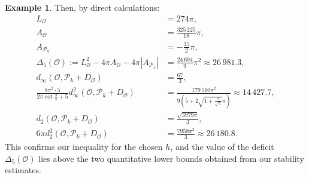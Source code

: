 \documentclass{amsart}
\theoremstyle{definition}
\newtheorem{ex}[thm]{Example}
\numberwithin{equation}{section}
\begin{document}
\begin{ex}
Then, by direct calculations:
\begin{align*}
    L_{\mathcal{O}}&=274\pi,\\
    A_{\mathcal{O}}&=\frac{325\, 225}{18}\pi,\\
    A_{\mathcal{P}_5}&=-\frac{35}{2}\pi,\\
    \Delta_5(\mathcal O):=L_{\mathcal{O}}^2-4\pi A_{\mathcal{O}}-4\pi\left|A_{\mathcal{P}_5}\right|&=\frac{24\, 604}{9}\pi^2\approx 26\, 981.3,\\ 
    d_{\infty}\left(\mathcal{O},\mathcal{P}_k+D_{\mathcal{O}}\right)&=\frac{67}{3},\\ 
    \frac{8\pi^2\cdot 5}{2\pi\cot\frac{\pi}{5}+5}d_{\infty}^2\left(\mathcal{O},\mathcal{P}_k+D_{\mathcal{O}}\right)&=\frac{179\, 560\pi^2}{9\left(5+2\sqrt{1+\frac{2}{\sqrt{5}}}\pi\right)}\approx 14\,427.7,\\
    d_2\left(\mathcal{O},\mathcal{P}_k+D_{\mathcal{O}}\right)&=\frac{\sqrt{3979\pi}}{3},\\
    6\pi d_2^2\left(\mathcal{O},\mathcal{P}_k+D_{\mathcal{O}}\right)&=\frac{7958\pi^2}{3}\approx 26\, 180.8.
\end{align*}
This confirms our inequality for the chosen $h$, and the value of the deficit
$\Delta_5(\mathcal O)$ lies above the two quantitative
lower bounds obtained from our stability estimates.
\end{ex}



\end{document}
